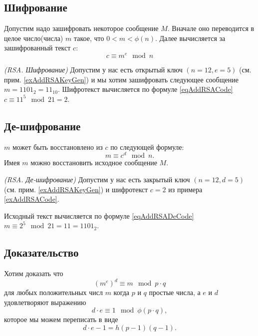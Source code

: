 \subsection{Шифрование}
Допустим надо зашифровать некоторое сообщение $M$. Вначале оно
переводится в целое число(числа) $m$ такое, что 
$0 < m < \phi\left(n\right)$. Далее вычисляется за зашифрованный текст
$c$:
\begin{equation}
c \equiv m^e \mod{n}
\label{eqAddRSACode}
\end{equation}

\begin{example}
\emph{(RSA. Шифрование)}
Допустим у нас есть открытый ключ $\left(n=12, e=5\right)$ (см. прим. \ref{exAddRSAKeyGen}) 
и мы хотим зашифровать следующее сообщение $m = 1101_2 = 11_{10}$. 
Шифротекст вычисляется по формуле \eqref{eqAddRSACode} $c \equiv 11^5 \mod{21} = 2$.
\label{exAddRSACode}
\end{example}

\subsection{Де-шифрование}
$m$ может быть восстановлено из $c$ по следующей формуле:
\begin{equation}
m \equiv c^d \mod{n}.
\label{eqAddRSADeCode}
\end{equation}
Имея $m$ можно восстановить исходное сообщение $M$.
\begin{example}
\emph{(RSA. Де-шифрование)}
Допустим у нас есть закрытый ключ $\left(n=12, d=5\right)$ (см. прим. \ref{exAddRSAKeyGen}) и шифротекст $c = 2$ из примера \ref{exAddRSACode}.

Исходный текст вычисляется по формуле \eqref{eqAddRSADeCode} $m \equiv 2^5 \mod{21} = 11 = 1101_2$.
\label{exAddRSADeCode}
\end{example}

\subsection{Доказательство}
Хотим доказать что 
\[
\left(m^e\right)^d \equiv m \mod{p \cdot q}
\]
для любых положительных числ $m$ когда $p$ и $q$ простые числа, а $e$
и $d$ удовлетворяют выражению
\[
d \cdot e \equiv 1 \mod{\phi\left(p \cdot q\right)},
\]
которое мы можем переписать в виде
\[
d \cdot e - 1 = h \left(p - 1\right)\left(q - 1\right).
\]

